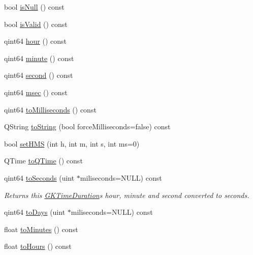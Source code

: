 \begin{DoxyCompactItemize}
\item 
bool \hyperlink{classGKTimeDuration_ae75629302e5023f67b9592c42721aa23}{is\+Null} () const 
\item 
bool \hyperlink{classGKTimeDuration_a2a580e8b2ba2dd8cb2b47eeb7f9d4138}{is\+Valid} () const 
\item 
qint64 \hyperlink{classGKTimeDuration_ac859fdb80b546d28bb27d954cb81713c}{hour} () const 
\item 
qint64 \hyperlink{classGKTimeDuration_aead0dfa90124e247a7f00d4202f42bf3}{minute} () const 
\item 
qint64 \hyperlink{classGKTimeDuration_abf201ad8041c5481ba30891a772ef76d}{second} () const 
\item 
qint64 \hyperlink{classGKTimeDuration_a93743059f0a51c62e27e4348f2c50708}{msec} () const 
\item 
qint64 \hyperlink{classGKTimeDuration_a18473b5f220016fc535caef9b9ba5c94}{to\+Milliseconds} () const 
\item 
Q\+String \hyperlink{classGKTimeDuration_a41d8d3a9c9c1b6b9fdeac2c268563566}{to\+String} (bool force\+Milliseconds=false) const 
\item 
bool \hyperlink{classGKTimeDuration_afef035c2daa3601775774a794f9a0e80}{set\+H\+MS} (int h, int m, int s, int ms=0)
\item 
Q\+Time \hyperlink{classGKTimeDuration_ac2508f1a09763814997ac8ff9038fd4c}{to\+Q\+Time} () const 
\item 
qint64 \hyperlink{classGKTimeDuration_a9e2c2978d6e8e7720e231efca7429bda}{to\+Seconds} (uint $\ast$miliseconds=N\+U\+LL) const \hypertarget{classGKTimeDuration_a9e2c2978d6e8e7720e231efca7429bda}{}\label{classGKTimeDuration_a9e2c2978d6e8e7720e231efca7429bda}

\begin{DoxyCompactList}\small\item\em Returns this \hyperlink{classGKTimeDuration}{G\+K\+Time\+Duration}\textquotesingle{}s hour, minute and second converted to seconds. \end{DoxyCompactList}\item 
qint64 \hyperlink{classGKTimeDuration_a5c39c7d68e6137529d6854969bd8ff49}{to\+Days} (uint $\ast$miliseconds=N\+U\+LL) const 
\item 
float \hyperlink{classGKTimeDuration_a78966d06b2b2cea7074a3b5d1f1c45ed}{to\+Minutes} () const 
\item 
float \hyperlink{classGKTimeDuration_a4f515cfbc64c2cf1b5398abe1b7d7b8d}{to\+Hours} () const \hypertarget{classGKTimeDuration_a4f515cfbc64c2cf1b5398abe1b7d7b8d}{}\label{classGKTimeDuration_a4f515cfbc64c2cf1b5398abe1b7d7b8d}


\end{DoxyCompactItemize}
